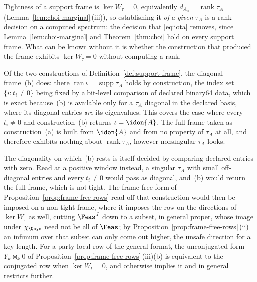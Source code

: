 
\begin{remark}\label{rem:tightness-by-construction}
Tightness of a support frame is $\ker W_{\tau}=0$, equivalently
$d_{A_0}=\operatorname{rank}\tau_A$ (Lemma~\ref{lem:choi-marginal}\,(iii)),
so establishing it \emph{of a given} $\tau_A$ is a rank decision on a
computed spectrum: the decision that \eqref{eq:iota} removes, since
Lemma~\ref{lem:choi-marginal} and Theorem~\ref{thm:choi} hold on every
support frame. What can be known without it is whether the construction
that produced the frame exhibits $\ker W_{\tau}=0$ without computing a rank.

Of the two constructions of Definition~\ref{def:support-frame}, the
diagonal frame~(b) does: there
$\operatorname{ran}\iota=\operatorname{supp}\tau_A$ holds by construction,
the index set $\{i:t_i\neq0\}$ being fixed by a bit-level comparison of
declared binary64 data, which is exact because~(b) is available only for a
$\tau_A$ diagonal in the declared basis, where its diagonal entries
\emph{are} its eigenvalues. This covers the case where every $t_i\neq0$
and construction~(b) returns $\iota=\idon{A}$. The full frame taken as
construction~(a) is built from $\idon{A}$ and from no property of $\tau_A$
at all, and therefore exhibits nothing about $\operatorname{rank}\tau_A$,
however nonsingular $\tau_A$ looks.

The diagonality on which~(b) rests is itself decided by comparing declared
entries with zero. Read at a positive window instead, a singular $\tau_A$
with small off-diagonal entries and every $t_i\ne0$ would pass as
diagonal, and~(b) would return the full frame, which is not tight. The
frame-free form of Proposition~\ref{prop:frame-free-rows} read off that
construction would then be imposed on a non-tight frame, where it imposes
the row on the directions of $\ker W_{\tau}$ as well, cutting $\Feas^{J}$
down to a subset, in general proper, whose image under $\chi_{\Qsys}$ need
not be all of $\Feas$; by Proposition~\ref{prop:frame-free-rows}\,(ii) an
infimum over that subset can only come out higher, the unsafe direction for
a key length. For a party-local row of the general format, the
unconjugated form $Y_k\bowtie_k0$ of
Proposition~\ref{prop:frame-free-rows}\,(iii)(b) is equivalent to the
conjugated row when $\ker W_t=0$, and otherwise implies it and in general
restricts further.


\end{remark}
